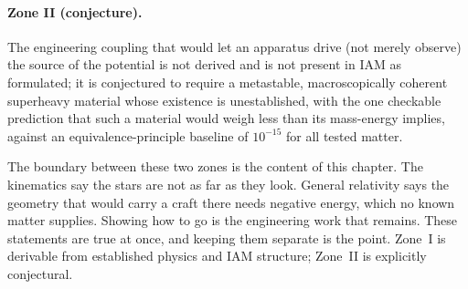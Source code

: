 \paragraph{Zone II (conjecture).} The engineering coupling that would let an apparatus drive (not merely observe) the source of the potential is not
derived and is not present in IAM as formulated; it is conjectured to require a metastable, macroscopically coherent superheavy material whose existence
is unestablished, with the one checkable prediction that such a material would weigh less than its mass-energy implies, against an
equivalence-principle baseline of $10^{-15}$ for all tested matter.

The boundary between these two zones is the content of this chapter. The kinematics say the stars are not as far as they look. General
relativity says the geometry that would carry a craft there needs negative energy, which no known matter supplies. Showing how to go is the engineering work that remains. These statements are true at once, and keeping them separate is the point. Zone~I is derivable from established physics and IAM structure;
Zone~II is explicitly conjectural. \interp

